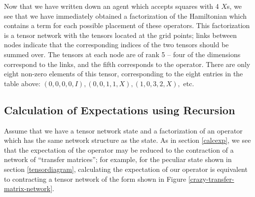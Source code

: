 \documentclass[12pt]{amsbook}
\theoremstyle{plain}
\theoremstyle{definition}
\theoremstyle{remark}
\begin{document}
Now that we have written down an agent which accepts squares with 4 $X$s, we see that we have immediately obtained a factorization of the Hamiltonian which contains a term for each possible placement of these operators.  This factorization is a tensor network with the tensors located at the grid points;  links between nodes indicate that the corresponding indices of the two tensors should be summed over.  The tensors at each node are of rank 5 -- four of the dimensions correspond to the links, and the fifth corresponds to the operator.  There are only eight non-zero elements of this tensor, corresponding to the eight entries in the table above: $(0,0,0,0,I), (0,0,1,1,X), (1,0,3,2,X),$ etc.

\subsection{Calculation of Expectations using Recursion}

Assume that we have a tensor network state and a factorization of an operator which has the same network structure as the state.  As in section \ref{calcexp}, we see that the expectation of the operator may be reduced to the contraction of a network of ``transfer matrices'';  for example, for the peculiar state shown in section \ref{tensordiagram}, calculating the expectation of our operator is equivalent to contracting a tensor network of the form shown in Figure \ref{crazy-transfer-matrix-network}.
\end{document}
